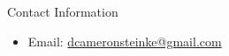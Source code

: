 \documentclass[final]{beamer}
\newlength{\sepwid}
\newlength{\sidewid}
\begin{document}
\begin{frame}
\begin{columns}[t]
\begin{column}{\sidewid}



\begin{block}{Contact Information}

\begin{itemize}
\item Email: \href{mailto:dcameronsteinke@gmail.com}{dcameronsteinke@gmail.com}
\end{itemize}

\end{block}



\end{column} %

\begin{column}{\sepwid}\end{column} %

\end{columns} %

\end{frame} %
\end{document}
